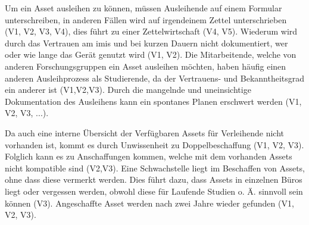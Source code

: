 Um ein Asset ausleihen zu können, müssen Ausleihende auf einem Formular unterschreiben, in anderen
Fällen wird auf irgendeinem Zettel unterschrieben (V1, V2, V3, V4), dies führt zu einer
Zettelwirtschaft (V4, V5). Wiederum wird durch das Vertrauen am \ac{imis} und bei kurzen Dauern
nicht dokumentiert, wer oder wie lange das Gerät genutzt wird (V1, V2). Die Mitarbeitende, welche
von anderen Forschungsgruppen ein Asset ausleihen möchten, haben häufig einen anderen Ausleihprozess
als Studierende, da der Vertrauens- und Bekanntheitsgrad ein anderer ist (V1,V2,V3). Durch die
mangelnde und uneinsichtige Dokumentation des Ausleihens kann ein spontanes Planen erschwert werden
(V1, V2, V3, ...).

Da auch eine interne Übersicht der Verfügbaren Assets für Verleihende nicht vorhanden ist, kommt es
durch Unwissenheit zu Doppelbeschaffung (V1, V2, V3). Folglich kann es zu Anschaffungen kommen,
welche mit dem vorhanden Assets nicht kompatible sind (V2,V3). Eine Schwachstelle liegt im
Beschaffen von Assets, ohne dass diese vermerkt werden. Dies führt dazu, dass Assets in einzelnen
Büros liegt oder vergessen werden, obwohl diese für Laufende Studien o. Ä. sinnvoll sein können
(V3). Angeschaffte Asset werden nach zwei Jahre wieder gefunden (V1, V2, V3).


